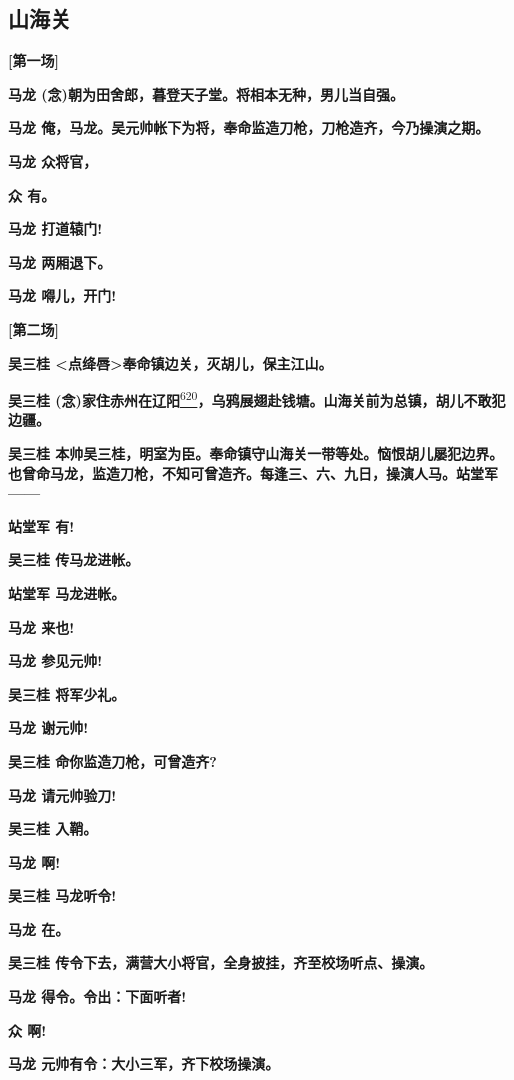 \hypertarget{ux5c71ux6d77ux5173}{%
\subsection{山海关}\label{ux5c71ux6d77ux5173}}

\textbf{{[}第一场{]}}

\textbf{马龙 (念)朝为田舍郎，暮登天子堂。将相本无种，男儿当自强。}

\textbf{马龙
俺，马龙。吴元帅帐下为将，奉命监造刀枪，刀枪造齐，今乃操演之期。}

\textbf{马龙 众将官，}

\textbf{众 有。}

\textbf{马龙 打道辕门!}

\textbf{马龙 两厢退下。}

\textbf{马龙 嘚儿，开门!}

\textbf{{[}第二场{]}}

\textbf{吴三桂
\textless{}点绛唇\textgreater{}奉命镇边关，灭胡儿，保主江山。}

\textbf{吴三桂
(念)家住赤州在辽阳}\protect\hyperlink{fn620}{\textsuperscript{620}}\textbf{，乌鸦展翅赴钱塘。山海关前为总镇，胡儿不敢犯边疆。}

\textbf{吴三桂
本帅吴三桂，明室为臣。奉命镇守山海关一带等处。恼恨胡儿屡犯边界。也曾命马龙，监造刀枪，不知可曾造齐。每逢三、六、九日，操演人马。站堂军------}

\textbf{站堂军 有!}

\textbf{吴三桂 传马龙进帐。}

\textbf{站堂军 马龙进帐。}

\textbf{马龙 来也!}

\textbf{马龙 参见元帅!}

\textbf{吴三桂 将军少礼。}

\textbf{马龙 谢元帅!}

\textbf{吴三桂 命你监造刀枪，可曾造齐?}

\textbf{马龙 请元帅验刀!}

\textbf{吴三桂 入鞘。}

\textbf{马龙 啊!}

\textbf{吴三桂 马龙听令!}

\textbf{马龙 在。}

\textbf{吴三桂 传令下去，满营大小将官，全身披挂，齐至校场听点、操演。}

\textbf{马龙 得令。令出：下面听者!}

\textbf{众 啊!}

\textbf{马龙 元帅有令：大小三军，齐下校场操演。}

